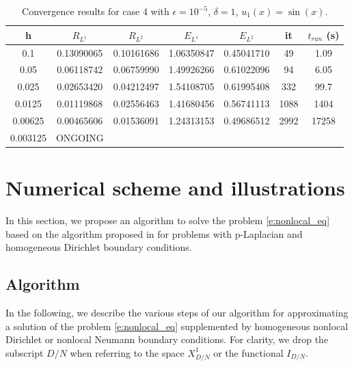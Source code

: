 \documentclass[11pt]{amsart}   	%
\theoremstyle{plain}
\numberwithin{equation}{section}
\begin{document}
\begin{table}[H]
    \centering
    \caption{Convergence results for case 4 with $\epsilon=10^{-5}$, $\delta=1$, $u_1(x)=\sin(x)$.}%
    \begin{tabular}{|c||c|c||c|c||c|c|}
    \hline
    h & $R_{L^1}$ & $R_{L^2} $  & $E_{L^1}$ & $E_{L^2}$ & it & $t_{run}$ (s)
    \\ \hline
    0.1 &  0.13090065 & 0.10161686 & 1.06350847 & 0.45041710 & 49 & 1.09
    \\ \hline
    0.05 & 0.06118742 & 0.06759990 & 1.49926266 & 0.61022096 & 94 & 6.05
    \\ \hline
    0.025 & 0.02653420 & 0.04212497 & 1.54108705 & 0.61995408 & 332&   99.7   
    \\ \hline
    0.0125 & 0.01119868 & 0.02556463 & 1.41680456 & 0.56741113 & 1088 & 1404
    \\ \hline
    0.00625 & 0.00465606 & 0.01536091 & 1.24313153 & 0.49686512 & 2992 & 17258    
    \\ \hline
    0.003125 & ONGOING & & & &  &
    \\ \hline  
    \end{tabular}
    \label{tab:num_case_4}
\end{table}

\fi




\section{Numerical scheme and illustrations} \label{s:numerics}
In this section, we propose an algorithm to solve the problem \eqref{e:nonlocal_eq} based on the algorithm proposed in \cite{bailova2021mountain} for problems with p-Laplacian and homogeneous Dirichlet boundary conditions.

\subsection{Algorithm}\label{s:numerics_algo}
In the following, we describe the various steps of our algorithm for approximating a solution of the problem \eqref{e:nonlocal_eq} supplemented by homogeneous nonlocal Dirichlet or nonlocal Neumann boundary conditions. For clarity, we drop the subscript $D/N$ when referring to the space $X_{D/N}^1$ or the functional $I_{D/N}$. 
\end{document}
